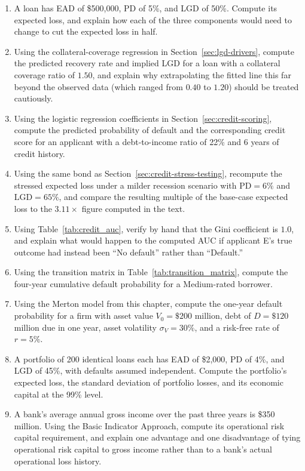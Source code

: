 \documentclass[../ai_in_finance]{subfiles}
\begin{document}
\begin{enumerate}[exercises]
    \item A loan has EAD of \$500,000, PD of 5\%, and LGD of 50\%. Compute its expected loss, and explain how each of the three components would need to change to cut the expected loss in half.
    \item Using the collateral-coverage regression in Section~\ref{sec:lgd-drivers}, compute the predicted recovery rate and implied LGD for a loan with a collateral coverage ratio of $1.50$, and explain why extrapolating the fitted line this far beyond the observed data (which ranged from $0.40$ to $1.20$) should be treated cautiously.
    \item Using the logistic regression coefficients in Section~\ref{sec:credit-scoring}, compute the predicted probability of default and the corresponding credit score for an applicant with a debt-to-income ratio of 22\% and 6 years of credit history.
    \item Using the same bond as Section~\ref{sec:credit-stress-testing}, recompute the stressed expected loss under a milder recession scenario with $\text{PD}=6\%$ and $\text{LGD}=65\%$, and compare the resulting multiple of the base-case expected loss to the $3.11\times$ figure computed in the text.
    \item Using Table~\ref{tab:credit_auc}, verify by hand that the Gini coefficient is $1.0$, and explain what would happen to the computed AUC if applicant E's true outcome had instead been ``No default'' rather than ``Default.''
    \item Using the transition matrix in Table~\ref{tab:transition_matrix}, compute the four-year cumulative default probability for a Medium-rated borrower.
    \item\label{ex:creditrisk-merton-pd} Using the Merton model from this chapter, compute the one-year default probability for a firm with asset value $V_0=\$200$ million, debt of $D=\$120$ million due in one year, asset volatility $\sigma_V=30\%$, and a risk-free rate of $r=5\%$.
    \item A portfolio of 200 identical loans each has EAD of \$2,000, PD of 4\%, and LGD of 45\%, with defaults assumed independent. Compute the portfolio's expected loss, the standard deviation of portfolio losses, and its economic capital at the 99\% level.
    \item A bank's average annual gross income over the past three years is \$350 million. Using the Basic Indicator Approach, compute its operational risk capital requirement, and explain one advantage and one disadvantage of tying operational risk capital to gross income rather than to a bank's actual operational loss history.

\end{enumerate}
\end{document}

